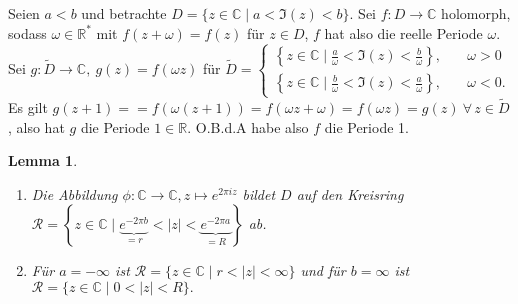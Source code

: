 \documentclass[a4paper,12pt]{article}
\theoremstyle{newthm}
\newtheorem{lem}[thm]{Lemma}
\theoremstyle{newdef}
\theoremstyle{newrem}
\newcommand{\R}{\mathbb{R}}
\newcommand{\C}{\mathbb{C}}
\begin{document}
		Seien $ a<b $ und betrachte $ D = \{z \in \C \mid a < \Im(z) < b\}. $ Sei $ f: D \to \C $ holomorph, sodass $ \omega \in \R^* $ mit $ f(z + \omega) = f(z) $ für $z \in D$, $f$ hat also die reelle Periode $\omega$.\\
		Sei $g: \tilde{D} \to \C,\ g(z) = f(\omega z)$ für $\tilde{D} = \begin{cases}
		\left\{ z \in \C \mid \frac{a}{\omega} < \Im(z) < \frac{b}{\omega} \right\}, \quad &\omega > 0\\
		\left\{ z \in \C \mid \frac{b}{\omega} < \Im(z) < \frac{a}{\omega} \right\}, \quad &\omega < 0.
		\end{cases}$\\
		Es gilt $ g(z+1) = = f(\omega(z+1)) = f(\omega z + \omega) = f(\omega z) = g(z)\ \forall \,z \in \tilde{D} $, also hat $g$ die Periode $1 \in \R$. O.B.d.A  habe also $f$ die Periode 1.
		
		\begin{lem}
			\begin{enumerate}[label={\roman*})]
				\item Die Abbildung $ \phi: \C\to \C, z \mapsto e^{2\pi iz} $ bildet $D$ auf den Kreisring $ \mathcal{R} = \left\{ z \in \C \mid \underbrace{e^{-2\pi b}}_{=r} < |z| < \underbrace{e^{-2\pi a}}_{=R} \right\} $ ab.
				\item Für $ a = - \infty $ ist $ \mathcal{R} = \{z \in \C \mid r < |z| < \infty\} $ und für $ b = \infty $ ist $ \mathcal{R} = \{ z\in \C \mid 0 < |z| < R\}. $
			\end{enumerate}
		\end{lem}
		
\end{document}
